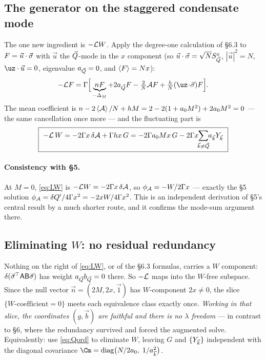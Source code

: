 \subsection{The generator on the staggered condensate mode}
The one new ingredient is $-\mathcal{L} W$. Apply the degree-one calculation of \S6.3 to
$F=\vec u\cdot\vec\sigma$ with $\vec u$ the $\vec Q$-mode in the $x$ component (so $\vec u\cdot\vec\sigma=\sqrt N S^x_{\vec Q}$,
$|\vec u|^{2}=N$, $\uz\cdot\vec u=0$, eigenvalue $a_{\vec Q}=0$, and $\left\langle F \right\rangle=Nx$):
\begin{equation}
  -\Lc F=\Gamma\Big[\underbrace{nF}_{-\Delta_M}+2a_{\bQ}F
   -\tfrac2N\Ac F+\tfrac hN(\uz\!\cdot\!\bs)F\Big].
\end{equation}
The mean coefficient is $n-2\left\langle \mathcal{A} \right\rangle/N+hM=2-2(1+a_0M^{2})+2a_0M^{2}=0$ --- the same
cancellation once more --- and the fluctuating part is
\begin{equation}
  \boxed{\ -\Lc\,W=-2\Gamma x\,\delta\Ac+\Gamma h x\,G
   =-2\Gamma a_0Mx\,G-2\Gamma x\!\!\sum_{\bk\neq\bQ}\!\!a_{\bk}Y_{\bk}\ }
  \label{eq:LW}
\end{equation}

\paragraph{Consistency with \S5.} At $M=0$, \eqref{eq:LW} is $-\mathcal{L} W=-2\Gamma x\,\delta\mathcal{A}$,
so $\phi_{\mathcal{A}}=-W/2\Gamma x$ --- exactly the \S5 solution
$\phi_{\mathcal{A}}=\delta Q'/4\Gamma x^{2}=-2xW/4\Gamma x^{2}$. This is an independent derivation
of \S5's central result by a much shorter route, and it confirms the mode-sum argument
there.

\subsection{Eliminating $W$: no residual redundancy}
Nothing on the right of \eqref{eq:LW}, or of the \S6.3 formulas, carries a $W$ component:
$\delta(\vec\sigma^\top\mathsf A\mathsf B\vec\sigma)$ has weight $a_{\vec Q}b_{\vec Q}=0$ there. So $-\mathcal{L}$ maps
into the $W$-free subspace. Since the null vector $\vec n=(2M,2x,\vec1)$ has $W$-component
$2x\neq0$, the slice $\{W\text{-coefficient}=0\}$ meets each equivalence class exactly once.
\emph{Working in that slice, the coordinates $(g,\vec b)$ are faithful and there is no
$\lambda$ freedom} --- in contrast to \S6, where the redundancy survived and forced the
augmented solve. Equivalently: use \eqref{eq:Qord} to eliminate $W$, leaving $G$ and
$\{Y_{\vec k}\}$ independent with the diagonal covariance
$\Cm=\mathrm{diag}\big(N/2a_0,\;1/a_{\bk}^{2}\big)$.

